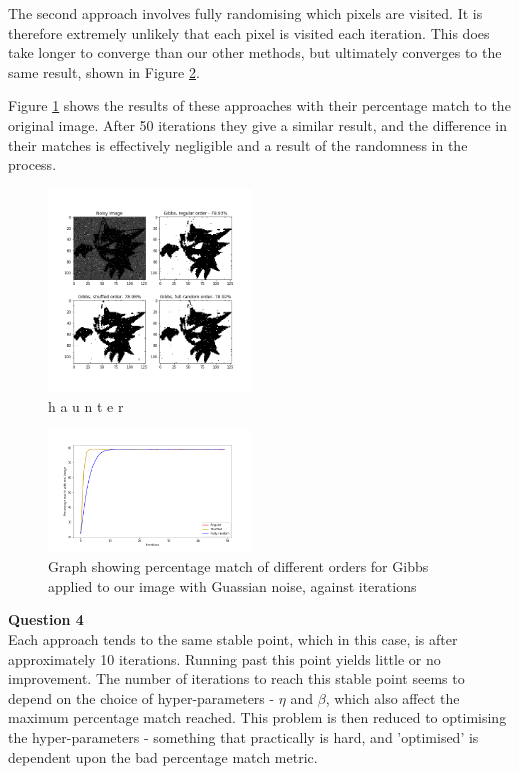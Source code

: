 \documentclass[10pt, a4paper, twocolumn]{article} %
\begin{document}
The second approach involves fully randomising which pixels are visited. It is therefore extremely unlikely that each pixel is visited each iteration. This does take longer to converge than our other methods, but ultimately converges to the same result, shown in Figure \ref{fig:GibbOrderComp}.

Figure \ref{fig:GibbOrderHaunter} shows the results of these approaches with their percentage match to the original image. After 50 iterations they give a similar result, and the difference in their matches is effectively negligible and a result of the randomness in the process.
\begin{figure}
    \centering
    \includegraphics[width=0.48\textwidth]{images/HaunterGibbGridGuassian.png}
    \caption{h a u n t e r}
    \label{fig:GibbOrderHaunter}
\end{figure}
\begin{figure}
    \centering
    \includegraphics[width=0.48\textwidth]{images/GibbGuassianMatch.png}
    \caption{Graph showing percentage match of different orders for Gibbs applied to our image with Guassian noise, against iterations}
    \label{fig:GibbOrderComp}
\end{figure}

\textbf{Question 4}\\
Each approach tends to the same stable point, which in this case, is after approximately 10 iterations. Running past this point yields little or no improvement. The number of iterations to reach this stable point seems to depend on the choice of hyper-parameters - $\eta$ and $\beta$, which also affect the maximum percentage match reached. This problem is then reduced to optimising the hyper-parameters - something that practically is hard, and 'optimised' is dependent upon the bad percentage match metric.
\end{document}
